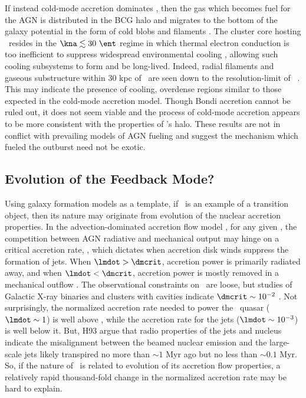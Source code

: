 \documentclass[useAMS,usenatbib]{mn2e}
\begin{document}
If instead cold-mode accretion dominates \citep{pizzolato05}, then the
gas which becomes fuel for the AGN is distributed in the BCG halo and
migrates to the bottom of the galaxy potential in the form of cold
blobs and filaments \citep{2010MNRAS.408..961P}. The cluster core
hosting \irs\ resides in the $\kna \la 30 ~\ent$ regime in which
thermal electron conduction is too inefficient to suppress widespread
environmental cooling \citep{conduction}, allowing such cooling
subsystems to form and be long-lived. Indeed, radial filaments and
gaseous substructure within 30 kpc of \irs\ are seen down to the
resolution-limit of \hst\ \citep{1999Ap&SS.266..113A}. This may
indicate the presence of cooling, overdense regions similar to those
expected in the cold-mode accretion model. Though Bondi accretion
cannot be ruled out, it does not seem viable and the process of
cold-mode accretion appears to be more consistent with the properties
of \irs's halo. These results are not in conflict with prevailing
models of AGN fueling and suggest the mechanism which fueled the
outburst need not be exotic.

\subsection{Evolution of the Feedback Mode?}

Using galaxy formation models as a template, if \irs\ is an example of
a transition object, then its nature may originate from evolution of
the nuclear accretion properties. In the advection-dominated accretion
flow model \citep{adaf}, for any given \mbh, the competition between
AGN radiative and mechanical output may hinge on a critical accretion
rate, \dmcrit, which dictates when accretion disk winds suppress the
formation of jets. When $\lmdot > \dmcrit$, accretion power is
primarily radiated away, and when $\lmdot < \dmcrit$, accretion power
is mostly removed in a mechanical outflow
\citep{1997ApJ...489..865E}. The observational constraints on
\dmcrit\ are loose, but studies of Galactic X-ray binaries and
clusters with cavities indicate $\dmcrit \sim 10^{-2}$
\citep[\eg][]{2003MNRAS.344...60G, 2008NewAR..51..733N, minaspin}. Not
surprisingly, the normalized accretion rate needed to power the
\irs\ quasar ($\lmdot \sim 1$) is well above \dmcrit, while the
accretion rate for the jets ($\lmdot \sim 10^{-3}$) is well below
it. But, H93 argue that radio properties of the jets and nucleus
indicate the misalignment between the beamed nuclear emission and the
large-scale jets likely transpired no more than $\sim 1$ Myr ago but
no less than $\sim 0.1$ Myr. So, if the nature of \irs\ is related to
evolution of its accretion flow properties, a relatively rapid
thousand-fold change in the normalized accretion rate may be hard to
explain.
\end{document}
